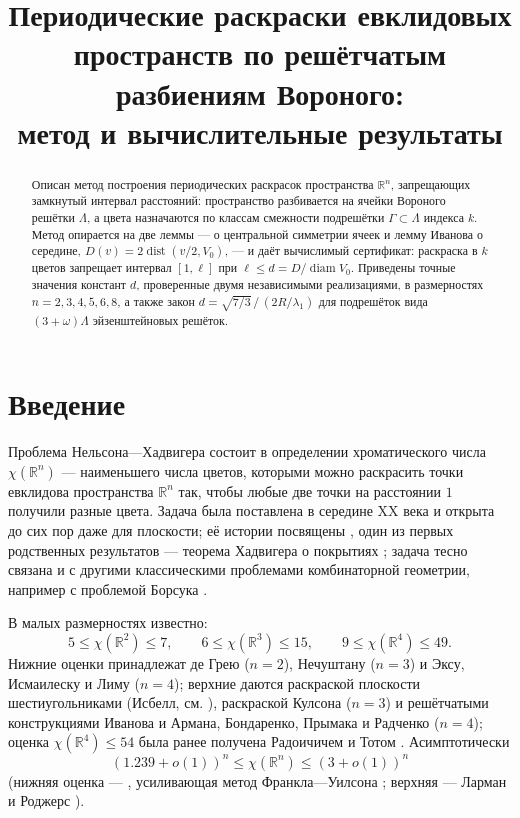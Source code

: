 \documentclass[12pt]{article}
\title{Периодические раскраски евклидовых пространств по решётчатым
разбиениям Вороного:\\ метод и вычислительные результаты}
\author{}
\date{}
\theoremstyle{plain}
\theoremstyle{definition}
\theoremstyle{remark}
\newcommand{\RR}{\mathbb{R}}
\DeclareMathOperator{\diam}{diam}
\DeclareMathOperator{\dist}{dist}
\begin{document}
\maketitle

\begin{abstract}
Описан метод построения периодических раскрасок пространства $\RR^n$,
запрещающих замкнутый интервал расстояний: пространство разбивается на ячейки
Вороного решётки $\Lambda$, а цвета назначаются по классам смежности
подрешётки $\Gamma\subset\Lambda$ индекса $k$. Метод опирается на две леммы ---
о центральной симметрии ячеек и лемму Иванова о середине,
$D(v)=2\dist(v/2,V_0)$, --- и даёт вычислимый сертификат: раскраска в $k$
цветов запрещает интервал $[1,\ell]$ при $\ell\le d=D/\diam V_0$. Приведены
точные значения констант $d$, проверенные двумя независимыми реализациями, в
размерностях $n=2,3,4,5,6,8$, а также закон
$d=\sqrt{7/3}\,/\,(2R/\lambda_1)$ для подрешёток вида $(3+\omega)\Lambda$
эйзенштейновых решёток.
\end{abstract}

\section{Введение}

Проблема Нельсона---Хадвигера состоит в определении хроматического числа
$\chi(\RR^n)$ --- наименьшего числа цветов, которыми можно раскрасить точки
евклидова пространства $\RR^n$ так, чтобы любые две точки на расстоянии $1$
получили разные цвета. Задача была поставлена в середине XX века и открыта до
сих пор даже для плоскости; её истории посвящены
\cite{Jensen1995,Soifer1991,Soifer2004,Soifer2008,Raigorodskii2003}, один из
первых родственных результатов --- теорема Хадвигера о покрытиях
\cite{Hadwiger1944}; задача тесно связана и с другими классическими проблемами
комбинаторной геометрии, например с проблемой Борсука \cite{Borsuk1933}.

В малых размерностях известно:
\[
5 \le \chi(\RR^2) \le 7, \qquad
6 \le \chi(\RR^3) \le 15, \qquad
9 \le \chi(\RR^4) \le 49.
\]
Нижние оценки принадлежат де Грею \cite{deGrey2018} ($n=2$), Нечуштану
\cite{Nechushtan2002} ($n=3$) и Эксу, Исмаилеску и Лиму \cite{Exoo2014}
($n=4$); верхние даются раскраской плоскости шестиугольниками (Исбелл, см.
\cite{Soifer2008}), раскраской Кулсона \cite{Coulson2002} ($n=3$) и
решётчатыми конструкциями Иванова \cite{Ivanov2006} и Армана, Бондаренко,
Прымака и Радченко \cite{Arman2021} ($n=4$); оценка $\chi(\RR^4)\le 54$ была
ранее получена Радоичичем и Тотом \cite{Radoicic2003}. Асимптотически
\[
(1.239+o(1))^n \le \chi(\RR^n) \le (3+o(1))^n
\]
(нижняя оценка --- \cite{Raigorodskii2000}, усиливающая метод Франкла---Уилсона
\cite{Frankl1981}; верхняя --- Ларман и Роджерс \cite{Larman1972}).
\end{document}
